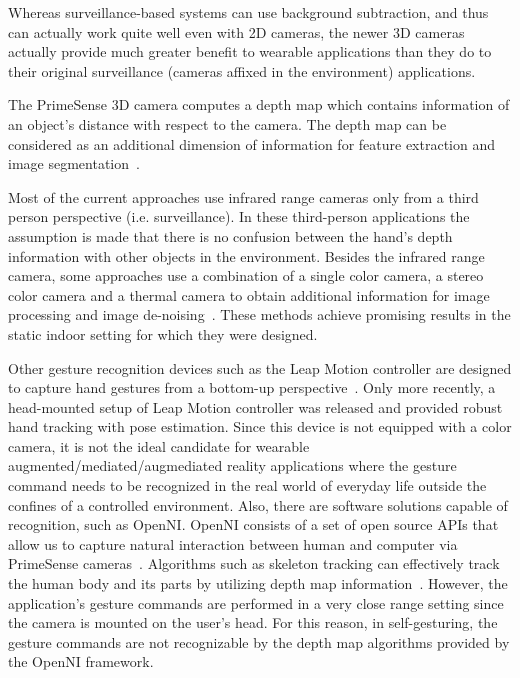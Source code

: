 Whereas surveillance-based systems can use background subtraction, and thus can actually work quite well even with 2D cameras, the newer 3D cameras actually provide much greater benefit to wearable applications than they do to their original surveillance (cameras affixed in the environment) applications.

The PrimeSense 3D camera computes a depth map which contains information of an object's distance with respect to the camera. The depth map can be considered as an additional dimension of information for feature extraction
and image segmentation~\cite{ren2011robust, uebersax2011real}.

Most of the current approaches use infrared range cameras only from a third person
perspective (i.e. surveillance). In these third-person applications the assumption is made that there is no confusion between the hand's depth information with other objects in the environment. Besides the infrared range camera, some approaches use a combination of a single color camera, a stereo color camera and a thermal camera to obtain additional information for image processing and image de-noising~\cite{appenrodt2010data}. These methods achieve promising results in the static indoor setting for which they were designed.

Other gesture recognition devices such as the Leap Motion controller are
designed to capture hand gestures from a bottom-up perspective~\cite{leapmotion}. Only more recently, a head-mounted setup of Leap Motion controller was released and provided robust hand tracking with pose estimation. Since this device is not equipped with a color camera, it is not the ideal candidate for wearable augmented/mediated/augmediated reality applications where the gesture command needs to be recognized in the real world of everyday life outside the confines of a controlled environment. Also, there are software
solutions capable of recognition, such as OpenNI. OpenNI consists of a set of
open source APIs that allow us to capture natural interaction between human
and computer via PrimeSense cameras~\cite{openniabout}. Algorithms such as
skeleton tracking can effectively track the human body and its parts
by utilizing depth map information~\cite{primesensenite2}. However,
the application's gesture commands are performed in a very close range setting since the camera
is mounted on the user's head. For this reason, in self-gesturing, the gesture commands are not
recognizable by the depth map algorithms provided by the OpenNI framework.

